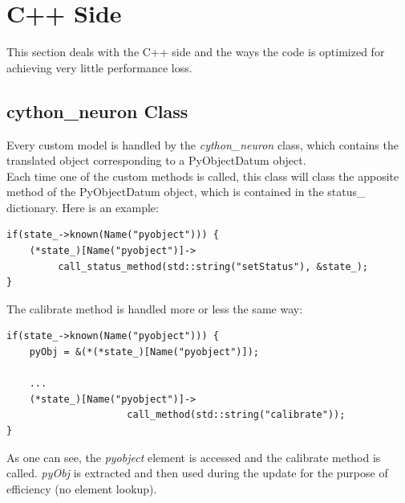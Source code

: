 \documentclass{article}
\begin{document}
\section{C++ Side}
This section deals with the C++ side and the ways the code is optimized for achieving very little performance loss.

\subsection{cython\_neuron Class}
Every custom model is handled by the \emph{cython\_neuron} class, which contains the translated object corresponding to a PyObjectDatum object.\\
Each time one of the custom methods is called, this class will class the apposite method of the PyObjectDatum object, which is contained in the status\_ dictionary. Here is an example:
\begin{verbatim}
if(state_->known(Name("pyobject"))) {
    (*state_)[Name("pyobject")]->
         call_status_method(std::string("setStatus"), &state_);
}
\end{verbatim}
The calibrate method is handled more or less the same way:
\begin{verbatim}
if(state_->known(Name("pyobject"))) {
    pyObj = &(*(*state_)[Name("pyobject")]);
	  
    ...
    (*state_)[Name("pyobject")]->
                     call_method(std::string("calibrate"));
}
\end{verbatim}
As one can see, the \emph{pyobject} element is accessed and the calibrate method is called. \emph{pyObj} is extracted and then used during the update for the purpose of efficiency (no element lookup).
\end{document}
